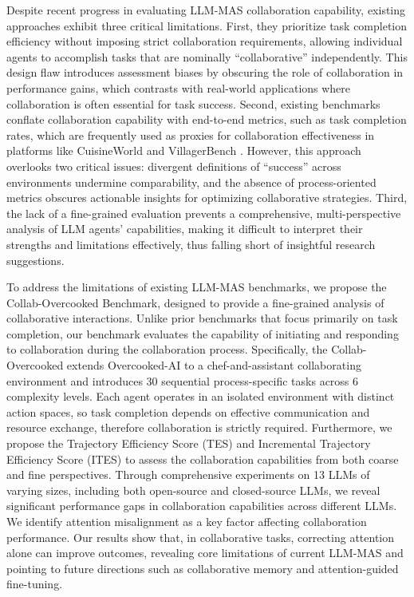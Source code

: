 \documentclass[11pt]{article}
\begin{document}
Despite recent progress in evaluating LLM-MAS collaboration capability, existing approaches exhibit three critical limitations. First, they prioritize task completion efficiency without imposing strict collaboration requirements, allowing individual agents to accomplish tasks that are nominally ``collaborative'' independently. This design flaw introduces assessment biases by obscuring the role of collaboration in performance gains, which contrasts with real-world applications where collaboration is often essential for task success. Second, existing benchmarks conflate collaboration capability with end-to-end metrics, such as task completion rates, which are frequently used as proxies for collaboration effectiveness in platforms like CuisineWorld \cite{gong2023mindagent} and VillagerBench \cite{dong2024villageragent}. However, this approach overlooks two critical issues: divergent definitions of ``success'' across environments undermine comparability, and the absence of process-oriented metrics obscures actionable insights for optimizing collaborative strategies. Third, the lack of a fine-grained evaluation prevents a comprehensive, multi-perspective analysis of LLM agents' capabilities, making it difficult to interpret their strengths and limitations effectively, thus falling short of insightful research suggestions.

To address the limitations of existing LLM-MAS benchmarks, we propose the Collab-Overcooked Benchmark, designed to provide a fine-grained analysis of collaborative interactions. Unlike prior benchmarks that focus primarily on task completion, our benchmark evaluates the capability of initiating and responding to collaboration during the collaboration process. Specifically, the Collab-Overcooked extends Overcooked-AI \cite{carroll2019utility} to a chef-and-assistant collaborating environment and introduces 30 sequential process-specific tasks across 6 complexity levels. Each agent operates in an isolated environment with distinct action spaces, so task completion depends on effective communication and resource exchange, therefore collaboration is strictly required. Furthermore, we propose the Trajectory Efficiency Score (TES) and Incremental Trajectory Efficiency Score (ITES) to assess the collaboration capabilities from both coarse and fine perspectives. Through comprehensive experiments on 13 LLMs of varying sizes, including both open-source and closed-source LLMs, we reveal significant performance gaps in collaboration capabilities across different LLMs. We identify attention misalignment as a key factor affecting collaboration performance. Our results show that, in collaborative tasks, correcting attention alone can improve outcomes, revealing core limitations of current LLM-MAS and pointing to future directions such as collaborative memory and attention-guided fine-tuning.
\end{document}
